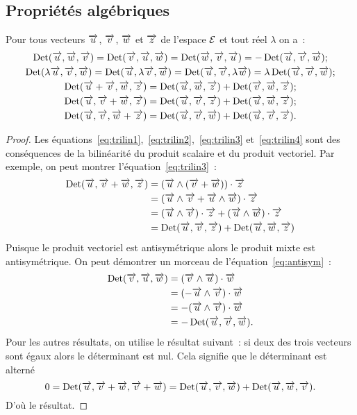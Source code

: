 \subsection{Propriétés algébriques}
\begin{prop}
  Pour tous vecteurs \(\vu\), \(\vv\), \(\vw\) et \( \vz\) de l'espace \(\E\) et tout réel \(\lambda\) on a~:
  \begin{gather}    
    \Det(\vu,\vw,\vv)=\Det(\vv,\vu,\vw)=\Det(\vw,\vv,\vu)=-\Det(\vu,\vv,\vw)\label{eq:antisym};\\
    \Det(\lambda\vu,\vv,\vw)=\Det(\vu,\lambda\vv,\vw)=\Det(\vu,\vv,\lambda\vw)=\lambda\Det(\vu,\vv,\vw)\label{eq:trilin1};\\
    \Det(\vu+\vv,\vw,\vz)=\Det(\vu,\vw,\vz)+\Det(\vv,\vw,\vz)\label{eq:trilin2};\\
    \Det(\vu,\vv+\vw,\vz)=\Det(\vu,\vv,\vz)+\Det(\vu,\vw,\vz)\label{eq:trilin3};\\
    \Det(\vu,\vv,\vw+\vz)=\Det(\vu,\vv,\vw)+\Det(\vu,\vv,\vz)\label{eq:trilin4}.
  \end{gather}
\end{prop}
\begin{proof}
  Les équations~\eqref{eq:trilin1},~\eqref{eq:trilin2},~\eqref{eq:trilin3} et~\eqref{eq:trilin4} sont des conséquences de la bilinéarité du produit scalaire et du produit vectoriel. Par exemple, on peut montrer l'équation~\eqref{eq:trilin3}~:
  \begin{align}
    \Det(\vu,\vv+\vw,\vz)&=(\vu\wedge(\vv+\vw))\cdot\vz\\
    &=(\vu\wedge\vv+\vu\wedge\vw)\cdot\vz\\
    &=(\vu\wedge\vv)\cdot\vz+(\vu\wedge\vw)\cdot\vz\\
    &=\Det(\vu,\vv,\vz)+\Det(\vu,\vw,\vz)
  \end{align}
Puisque le produit vectoriel est antisymétrique alors le produit mixte est antisymétrique. On peut démontrer un morceau de l'équation~\eqref{eq:antisym}~:
\begin{align}
  \Det(\vv,\vu,\vw)&=(\vv\wedge\vu)\cdot\vw\\
  &=(-\vu\wedge\vv)\cdot\vw\\
  &=-(\vu\wedge\vv)\cdot\vw\\
  &=-\Det(\vu,\vv,\vw).
\end{align}
Pour les autres résultats, on utilise le résultat suivant~: si deux des trois vecteurs sont égaux alors le déterminant est nul. Cela signifie que le déterminant est alterné
\begin{equation}
  0=\Det(\vu,\vv+\vw,\vv+\vw)=\Det(\vu,\vv,\vw)+\Det(\vu,\vw,\vv).
\end{equation}
D'où le résultat.
\end{proof}
